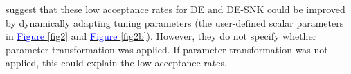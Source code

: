 \cite{brunetti2023depth} suggest that these low acceptance rates for DE and DE-SNK could be improved by dynamically adapting tuning parameters (the user-defined scalar parameters in \hyperref[fig2]{\textcolor{blue}{Figure }\ref{fig2}} and \hyperref[fig2b]{\textcolor{blue}{Figure }\ref{fig2b}}). However, they do not specify whether parameter transformation was applied. If parameter transformation was not applied, this could explain the low acceptance rates. %





